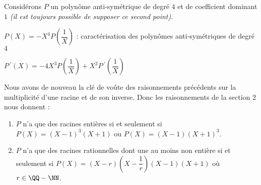 Considérons $P$ un polynôme anti-symétrique de degré $4$ et de coefficient dominant $1$ \emph{(il est toujours possible de supposer ce second point)}.

\medskip

$P(X) = -X^4 P\left( \dfrac1X \right)$ : caractérisation des polynômes anti-symétriques de degré $4$

\medskip

$P\,^{\prime}(X) = - 4 X^3 P\left( \dfrac1X \right) 
            + X^2 P\,^{\prime}\left( \dfrac1X \right)$


\medskip

Nous avons de nouveau la clé de voûte des raisonnements précédents sur la multiplicité d'une racine et de son inverse.
Donc les raisonnements de la section 2 nous donnent :

\begin{enumerate}
	\item $P$ n'a que des racines entières si et seulement si $P(X) = (X - 1)^3 (X + 1)$ ou $P(X) = (X - 1) (X + 1)^3$.

	\item $P$ n'a que des racines rationnelles dont une au moins non entière si et seulement si $P(X) = (X - r) \left( X - \dfrac1r \right) (X - 1) (X + 1)$ où $r \in \QQ - \NN$.
\end{enumerate}



